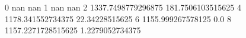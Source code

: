 0 nan nan
1 nan nan
2 1337.7498779296875 181.7506103515625
4 1178.341552734375 22.34228515625
6 1155.999267578125 0.0
8 1157.2271728515625 1.2279052734375
